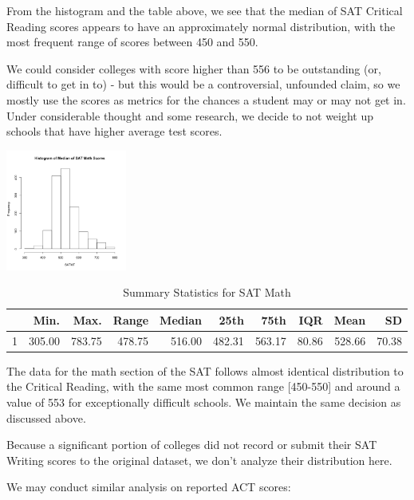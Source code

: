 \documentclass{article}\usepackage[]{graphicx}\usepackage[]{color}
\begin{document}
From the histogram and the table above, we see that the median of SAT Critical Reading scores appears to have an approximately normal distribution, with the most frequent range of scores between 450 and 550. \newline

We could consider colleges with score higher than 556 to be outstanding (or, difficult to get in to) - but this would be a controversial, unfounded claim, so we mostly use the scores as metrics for the chances a student may or may not get in. Under considerable thought and some research, we decide to not weight up schools that have higher average test scores.



{\centering \includegraphics[width=150px]{../images/histogram-SATMTMedian} 

}


\begin{table}[ht]
\centering
\begin{tabular}{rrrrrrrrrr}
  \hline
 & Min. & Max. & Range & Median & 25th & 75th & IQR & Mean & SD \\ 
  \hline
1 & 305.00 & 783.75 & 478.75 & 516.00 & 482.31 & 563.17 & 80.86 & 528.66 & 70.38 \\ 
   \hline
\end{tabular}
\caption{Summary Statistics for SAT Math} 
\end{table}


The data for the math section of the SAT follows almost identical distribution to the Critical Reading, with the same most common range [450-550] and around a value of 553 for exceptionally difficult schools. We maintain the same decision as discussed above.\newline

Because a significant portion of colleges did not record or submit their SAT Writing scores to the original dataset, we don't analyze their distribution here.\newline

We may conduct similar analysis on reported ACT scores:
\end{document}
